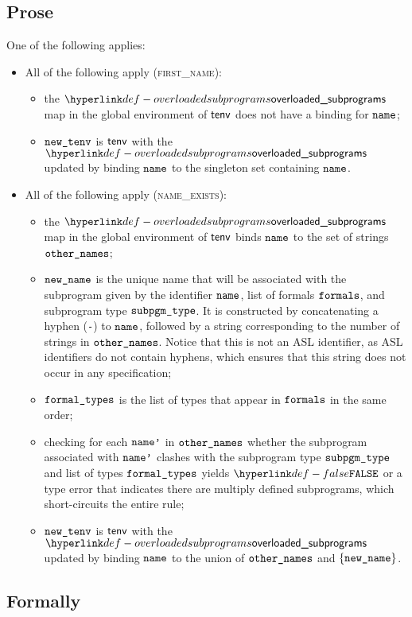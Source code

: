 \subsection{Prose}
One of the following applies:
\begin{itemize}
  \item All of the following apply (\textsc{first\_name}):
  \begin{itemize}
    \item the $\overloadedsubprograms$ map in the global environment of $\textsf{tenv}$ does not have a binding for $\texttt{name}$;
    \item $\texttt{new\_tenv}$ is $\textsf{tenv}$ with the $\overloadedsubprograms$ updated by binding $\texttt{name}$ to the singleton set containing
          $\texttt{name}$.
  \end{itemize}

  \item All of the following apply (\textsc{name\_exists}):
  \begin{itemize}
    \item the $\overloadedsubprograms$ map in the global environment of $\textsf{tenv}$ binds $\texttt{name}$ to the set of strings $\texttt{other\_names}$;
    \item $\texttt{new\_name}$ is the unique name that will be associated with the subprogram given by the identifier $\texttt{name}$, list of formals $\texttt{formals}$,
          and subprogram type $\texttt{subpgm\_type}$. It is constructed by concatenating a hyphen (\texttt{-}) to $\texttt{name}$, followed
          by a string corresponding to the number of strings in $\texttt{other\_names}$.
          Notice that this is not an ASL identifier, as ASL identifiers do not contain hyphens, which ensures that this string
          does not occur in any specification;
    \item $\texttt{formal\_types}$ is the list of types that appear in $\texttt{formals}$ in the same order;
    \item checking for each $\texttt{name'}$ in $\texttt{other\_names}$ whether the subprogram associated with $\texttt{name'}$ clashes
          with the subprogram type $\texttt{subpgm\_type}$ and list of types $\texttt{formal\_types}$ yields $\False$
          or a type error that indicates there are multiply defined subprograms, which short-circuits the entire rule;
    \item $\texttt{new\_tenv}$ is $\textsf{tenv}$ with the $\overloadedsubprograms$ updated by binding $\texttt{name}$ to the union of $\texttt{other\_names}$ and
          $\{\texttt{new\_name}\}$.
  \end{itemize}
\end{itemize}
\subsection{Formally}
\newcommand\stringconcat[0]{\hyperlink{def-stringconcat}{\texttt{+}}}
\newcommand\stringofint[0]{\hyperlink{def-stringofnat}{\texttt{string\_of\_nat}}}

